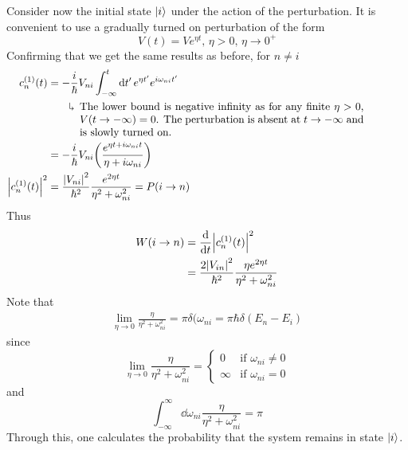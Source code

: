 \documentclass[12pt,a4paper,titlepage]{article}
\newcommand{\trm}[1]{\textrm{#1}} %
\newcommand{\explain}[1]{%
	\quad\rotatebox[origin=c]{180}{\enskip$\Lsh$}\hfill
	\begin{minipage}[t]{\dimexpr\linewidth-8em\relax}
	#1
	\end{minipage}\hspace{4em}\bigskip
}
\begin{document}
Consider now the initial state $\ket{i}$ under the action of the perturbation. It is convenient to use a gradually turned on perturbation of the form
\begin{equation}
V(t)=Ve^{\eta t},\,\eta>0,\,\eta\rightarrow0^{+}
\end{equation}
Confirming that we get the same results as before, for $n\neq i$
\begin{equation}
\begin{aligned}
c_{n}^{(1)}(t)&=-\frac{i}{\hbar}V_{ni}\int_{-\infty}^{t}\dd{t'}e^{\eta t'}e^{i\omega_{ni}t'}\\
&\quad\explain{The lower bound is negative infinity as for any finite $\eta>0$, $V(t\rightarrow-\infty)=0$. The perturbation is absent at $t\rightarrow-\infty$ and is slowly turned on.}\\
&=-\frac{i}{\hbar}V_{ni}\qty(\frac{e^{\eta t+i\omega_{ni}t}}{\eta+i\omega_{ni}})\\
\abs{c_{n}^{(1)}(t)}^{2}&=\frac{\abs{V_{ni}}^{2}}{\hbar^{2}}\frac{e^{2\eta t}}{\eta^{2}+\omega_{ni}^{2}}=P(i\rightarrow n)
\end{aligned}
\end{equation}
Thus
\begin{equation}
\begin{aligned}
W(i\rightarrow n)&=\dv{t}\abs{c_{n}^{(1)}(t)}^{2}\\
&=\frac{2\abs{V_{in}}^{2}}{\hbar^{2}}\frac{\eta e^{2\eta t}}{\eta^{2}+\omega_{ni}^{2}}
\end{aligned}
\end{equation}
Note that
\begin{equation}
\begin{aligned}
\lim_{\eta\rightarrow 0}\frac{\eta}{\eta^{2}+\omega_{ni}^{2}}=\pi\delta(\omega_{ni}=\pi\hbar\delta(E_{n}-E_{i})
\end{aligned}
\end{equation}
since
\begin{equation}
\lim_{\eta\rightarrow0}\frac{\eta}{\eta^{2}+\omega_{ni}^{2}}=\begin{cases}
0 & \trm{if $\omega_{ni}\neq0$}\\
\infty & \trm{if $\omega_{ni}=0$}
\end{cases}
\end{equation}
and
\begin{equation}
\int_{-\infty}^{\infty}\dd{\omega_{ni}}\frac{\eta}{\eta^{2}+\omega_{ni}^{2}}=\pi
\end{equation}
\newpage
Through this, one calculates the probability that the system remains in state $\ket{i}$.
\end{document}
